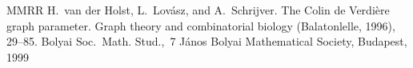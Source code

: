\documentclass{amsart}
\theoremstyle{remark}
\begin{document}
{\begin{thebibliography}{MMRR}
H.~van der Holst, L.~Lov\'asz, and A.~Schrijver.
The Colin de Verdi\`ere graph parameter.
Graph theory and combinatorial biology (Balatonlelle, 1996), 29–85.
Bolyai Soc.~Math. Stud.,~7
János Bolyai Mathematical Society, Budapest, 1999

\end{thebibliography}























}
\end{document}
